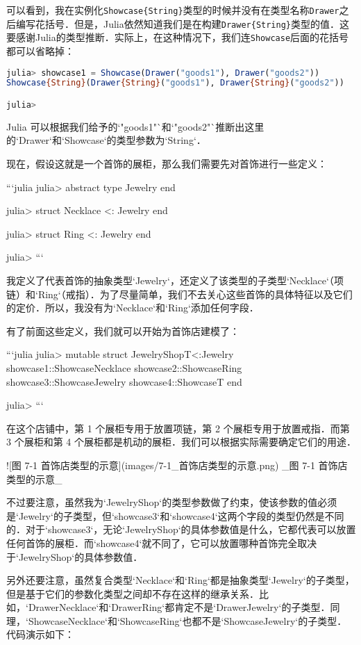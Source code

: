 可以看到，我在实例化\verb|Showcase{String}|类型的时候并没有在类型名称\verb|Drawer|之后编写花括号．但是，Julia依然知道我们是在构建\verb|Drawer{String}|类型的值．这要感谢Julia的类型推断．实际上，在这种情况下，我们连\verb|Showcase|后面的花括号都可以省略掉：

\begin{lstlisting}[language=julia]
julia> showcase1 = Showcase(Drawer("goods1"), Drawer("goods2"))
Showcase{String}(Drawer{String}("goods1"), Drawer{String}("goods2"))

julia> 
\end{lstlisting}

Julia 可以根据我们给予的`"goods1"`和`"goods2"`推断出这里的`Drawer`和`Showcase`的类型参数为`String`．

现在，假设这就是一个首饰的展柜，那么我们需要先对首饰进行一些定义：

```julia
julia> abstract type Jewelry end

julia> struct Necklace <: Jewelry end

julia> struct Ring <: Jewelry end

julia> 
```

我定义了代表首饰的抽象类型`Jewelry`，还定义了该类型的子类型`Necklace`（项链）和`Ring`（戒指）．为了尽量简单，我们不去关心这些首饰的具体特征以及它们的定价．所以，我没有为`Necklace`和`Ring`添加任何字段．

有了前面这些定义，我们就可以开始为首饰店建模了：

```julia
julia> mutable struct JewelryShop{T<:Jewelry}
           showcase1::Showcase{Necklace}
           showcase2::Showcase{Ring}
           showcase3::Showcase{Jewelry}
           showcase4::Showcase{T}
       end

julia> 
```

在这个店铺中，第 1 个展柜专用于放置项链，第 2 个展柜专用于放置戒指．而第 3 个展柜和第 4 个展柜都是机动的展柜．我们可以根据实际需要确定它们的用途．

![图 7-1 首饰店类型的示意](images/7-1_首饰店类型的示意.png)
_图 7-1 首饰店类型的示意_

不过要注意，虽然我为`JewelryShop`的类型参数做了约束，使该参数的值必须是`Jewelry`的子类型，但`showcase3`和`showcase4`这两个字段的类型仍然是不同的．对于`showcase3`，无论`JewelryShop`的具体参数值是什么，它都代表可以放置任何首饰的展柜．而`showcase4`就不同了，它可以放置哪种首饰完全取决于`JewelryShop`的具体参数值．

另外还要注意，虽然复合类型`Necklace`和`Ring`都是抽象类型`Jewelry`的子类型，但是基于它们的参数化类型之间却不存在这样的继承关系．比如，`Drawer{Necklace}`和`Drawer{Ring}`都肯定不是`Drawer{Jewelry}`的子类型．同理，`Showcase{Necklace}`和`Showcase{Ring}`也都不是`Showcase{Jewelry}`的子类型．代码演示如下：

